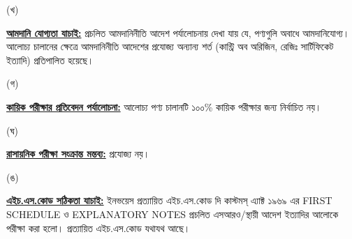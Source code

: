 \documentclass[12pt]{article}
\begin{document}
\begin{minipage}[t]{0.05\linewidth}
\hspace{1em}
\end{minipage}
\begin{minipage}[t]{0.05\linewidth}
(খ)
\end{minipage}
\begin{minipage}[t]{0.90\linewidth}
\underline{\textbf{আমদানি যোগ্যতা যাচাই:}}
প্রচলিত আমদানিনীতি আদেশ পর্যালোচনায় দেখা যায় যে, পণ্যগুলি অবাধে আমদানিযোগ্য।
আলোচ্য চালানের ক্ষেত্রে আমদানিনীতি আদেশের প্রযোজ্য অন্যান্য শর্ত (কান্ট্রি অব অরিজিন, রেজিঃ
সার্টিফিকেট ইত্যাদি) প্রতিপালিত হয়েছে।
\\
\end{minipage}
\begin{minipage}[t]{0.05\linewidth}
\hspace{1em}
\end{minipage}
\begin{minipage}[t]{0.05\linewidth}
(গ)
\end{minipage}
\begin{minipage}[t]{0.90\linewidth}
\underline{\textbf{কায়িক পরীক্ষার প্রতিবেদন পর্যালোচনা:}}
আলোচ্য পণ্য চালানটি ১০০\% কায়িক পরীক্ষার জন্য নির্বাচিত
নয়।
\\
\end{minipage}
\begin{minipage}[t]{0.05\linewidth}
\hspace{1em}
\end{minipage}
\begin{minipage}[t]{0.05\linewidth}
(ঘ)
\end{minipage}
\begin{minipage}[t]{0.90\linewidth}
\underline{\textbf{রাসায়নিক পরীক্ষা সংক্রান্ত মন্তব্য:}}
প্রযোজ্য নয়।
\\
\end{minipage}
\begin{minipage}[t]{0.05\linewidth}
\hspace{1em}
\end{minipage}
\begin{minipage}[t]{0.05\linewidth}
(ঙ)
\end{minipage}
\begin{minipage}[t]{0.90\linewidth}
\underline{\textbf{এইচ.এস.কোড সঠিকতা যাচাই:}}
ইনভয়েস প্রত্যায়িত এইচ.এস.কোড দি কাস্টমস্ এ্যাক্ট ১৯৬৯ এর FIRST SCHEDULE ও
EXPLANATORY NOTES প্রচলিত এসআরও/স্থায়ী আদেশ ইত্যাদির আলোকে পরীক্ষা করা হলো।
প্রত্যায়িত এইচ.এস.কোড যথাযথ আছে।
\\
\end{minipage}
\end{document}
